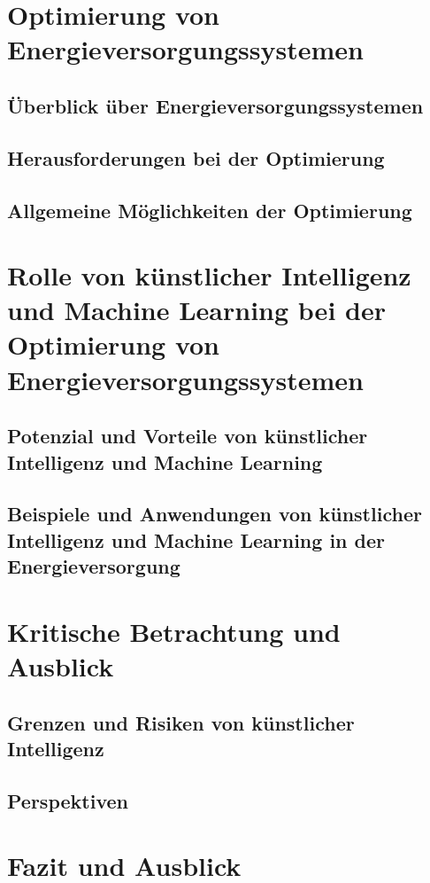 \documentclass[
11pt, 
a4paper,
DIV = 14,
twoside,
twocolumn, 
parskip =half, 
headsepline,
openright,
]{scrreprt}
\begin{document}
	\chapter{Optimierung von Energieversorgungssystemen}
	
	\section{Überblick über Energieversorgungssystemen}
	
	\section{Herausforderungen bei der Optimierung}
	
	\section{Allgemeine Möglichkeiten der Optimierung}
	
	

	\chapter{Rolle von künstlicher Intelligenz und Machine Learning bei der Optimierung von Energieversorgungssystemen}
	
	\section{Potenzial und Vorteile von künstlicher Intelligenz und Machine Learning}
	
	\section{Beispiele und Anwendungen von künstlicher Intelligenz und Machine Learning in der Energieversorgung}
	


	\chapter{Kritische Betrachtung und Ausblick}
	
	\section{Grenzen und Risiken von künstlicher Intelligenz}
	
	\section{Perspektiven}
	


	\chapter{Fazit und Ausblick}
	
\end{document}
